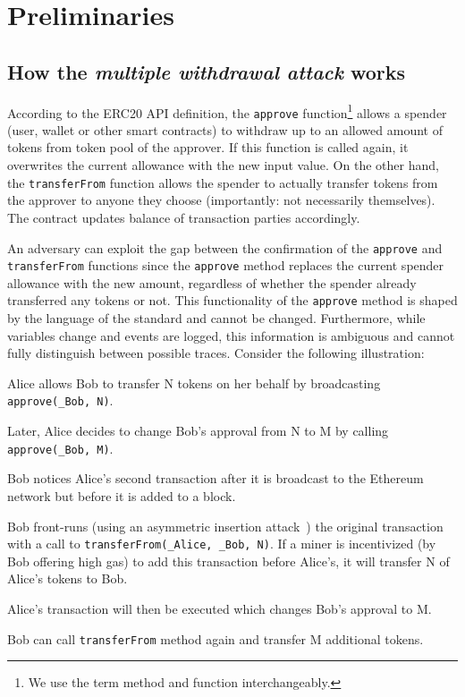 
\section{Preliminaries}

\subsection{How the \textit{multiple withdrawal attack} works}
According to the ERC20 API definition, the \texttt{approve} function\footnote{We use the term method and function interchangeably.}
allows a spender (\eg user, wallet or other smart contracts) to withdraw up to an allowed amount of tokens from token pool of the approver. If this function is called again, it overwrites the current allowance with the new input value. On the other hand, the \texttt{transferFrom} function allows the spender to actually transfer tokens from the approver to anyone they choose (importantly: not necessarily themselves). The contract updates balance of transaction parties accordingly. 

An adversary can exploit the gap between the confirmation of the \texttt{approve} and \texttt{transferFrom} functions since the \texttt{approve} method replaces the current spender allowance with the new amount, regardless of whether the spender already transferred any tokens or not. This functionality of the \texttt{approve} method is shaped by the language of the standard and cannot be changed. Furthermore, while variables change and events are logged, this information is ambiguous and cannot fully distinguish between possible traces. Consider the following illustration:

\begin{compactlistn}
	\item Alice allows Bob to transfer N tokens on her behalf by broadcasting \texttt{approve(\_Bob, N)}.
	\item Later, Alice decides to change Bob's approval from N to M  by calling \texttt{approve(\_Bob, M)}.
	\item Bob notices Alice's second transaction after it is broadcast to the Ethereum network but before it is added to a block.
	\item Bob front-runs (using an asymmetric insertion attack~\cite{eskandari2019sok}) the original transaction with a call to \texttt{transferFrom(\_Alice, \_Bob, N)}. If a miner is incentivized (\eg by Bob offering high gas) to add this transaction before Alice's, it will transfer N of Alice's tokens to Bob.
	\item Alice's transaction will then be executed which changes Bob's approval to M.
	\item Bob can call \texttt{transferFrom} method again and transfer M additional tokens.
\end{compactlistn}

